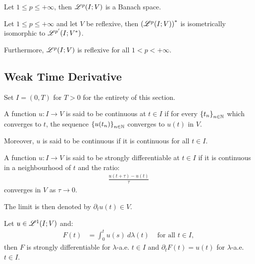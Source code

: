 \begin{theorem}
    Let $1 \leq p \leq +\infty$, then $\mathscr{L}^{p}(I; V)$ is a Banach space.
\end{theorem}

\begin{theorem} %
    Let $1 \leq p \leq +\infty$ and let $V$ be reflexive, then $\left( \mathscr{L}^{p}(I; V) \right)^*$ is isometrically isomorphic to $\mathscr{L}^{p^{\prime}}(I; V^*)$.

    Furthermore, $\mathscr{L}^{p}(I; V)$ is reflexive for all $1 < p < +\infty$.
\end{theorem}

\newpage
\subsection{Weak Time Derivative}

Set $I = (0, T)$ for $T > 0$ for the entirety of this section.

\begin{definition}[Continuity]
    A function $u\colon I \rightarrow V$ is said to be continuous at $t \in I$ if for every $\left\{ t_n \right\}_{n \in \mathbb{N}}$ which converges to $t$, the sequence $\left\{ u(t_n) \right\}_{n \in \mathbb{N}}$ converges to $u(t)$ in $V$.

    Moreover, $u$ is said to be continuous if it is continuous for all $t \in I$.
\end{definition}

\begin{definition}
    A function $u\colon I \rightarrow V$ is said to be strongly differentiable at $t \in I$ if it is continuous in a neighbourhood of $t$ and the ratio:
    \begin{align}
        \frac{u(t + \tau) - u(t)}{\tau}
    \end{align}
    converges in $V$ as $\tau \rightarrow 0$.

    The limit is then denoted by $\partial_t u(t) \in V$.
\end{definition}

\begin{theorem}
    Let $u \in \mathscr{L}^{1}(I; V)$ and:
    \begin{align}
        F(t) &= \int_0^t u(s) ~ d \lambda(t) &\text{ for all } t \in I,
    \end{align}
    then $F$ is strongly differentiable for $\lambda$-a.e. $t \in I$ and $\partial_t F(t) = u(t)$ for $\lambda$-a.e. $t \in I$.
\end{theorem}

